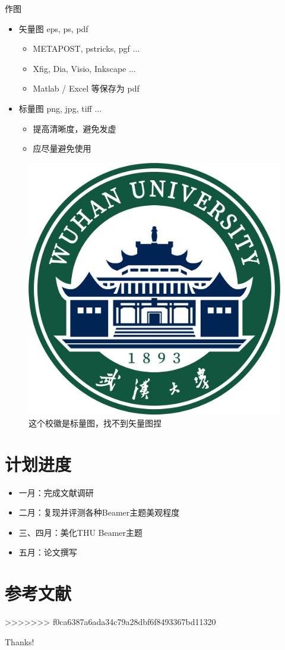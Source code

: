 \documentclass{beamer}
\begin{document}
\begin{frame}{作图}
    \begin{itemize}
        \item 矢量图 eps, ps, pdf
        \begin{itemize}
            \item METAPOST, pstricks, pgf $\ldots$
            \item Xfig, Dia, Visio, Inkscape $\ldots$
            \item Matlab / Excel 等保存为 pdf
        \end{itemize}
        \item 标量图 png, jpg, tiff $\ldots$
        \begin{itemize}
            \item 提高清晰度，避免发虚
            \item 应尽量避免使用
        \end{itemize}
    \end{itemize}
    \begin{figure}[htpb]
        \centering
        \includegraphics[width=0.2\linewidth]{pic/whulogo.png}
        \caption{这个校徽是标量图，找不到矢量图捏}
    \end{figure}
\end{frame}

\section{计划进度}
\begin{frame}
    \begin{itemize}
        \item 一月：完成文献调研
        \item 二月：复现并评测各种Beamer主题美观程度
        \item 三、四月：美化THU Beamer主题
        \item 五月：论文撰写
    \end{itemize}
\end{frame}

\section{参考文献}

\begin{frame}[allowframebreaks]
    
    
\end{frame}
>>>>>>> f0ca6387a6ada34c79a28dbf6f8493367bd11320

\begin{frame}
    \begin{center}
        {\Huge\calligra Thanks!}
    \end{center}
\end{frame}
\end{document}
